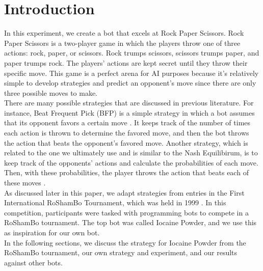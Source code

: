 

\section{Introduction}
\label{sec:intro}

In this experiment, we create a bot that excels at Rock Paper Scissors. Rock Paper Scissors is a two-player game in which the players throw one of three actions: rock, paper, or scissors. Rock trumps scissors, scissors trumps paper, and paper trumps rock. The players' actions are kept secret until they throw their specific move. This game is a perfect arena for AI purposes because it's relatively simple to develop strategies and predict an opponent's move since there are only three possible moves to make. \\

There are many possible strategies that are discussed in previous literature. For instance, Beat Frequent Pick (BFP) is a simple strategy in which a bot assumes that its opponent favors a certain move \cite{iocaine}. It keeps track of the number of times each action is thrown to determine the favored move, and then the bot throws the action that beats the opponent's favored move. Another strategy, which is related to the one we ultimately use and is similar to the Nash Equilibirum, is to keep track of the opponents' actions and calculate the probabilities of each move. Then, with these probabilities, the player throws the action that beats each of these moves \cite{smartrobots}. \\

As discussed later in this paper, we adapt strategies from entries in the First International RoShamBo Tournament, which was held in 1999 \cite{iocaine}. In this competition, participants were tasked with programming bots to compete in a RoShamBo tournament. The top bot was called Iocaine Powder, and we use this as inspiration for our own bot.\\

In the following sections, we discuss the strategy for Iocaine Powder from the RoShamBo tournament, our own strategy and experiment, and our results against other bots.




